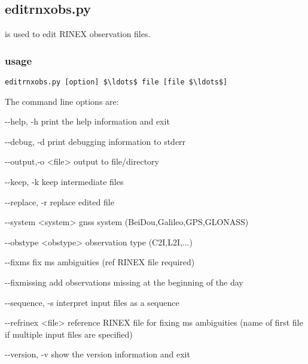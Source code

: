 \subsection{editrnxobs.py}

\hypertarget{h:editrnxobs}{}

 is used to edit RINEX observation files. 

\subsubsection{usage}

\begin{lstlisting}[mathescape=true]
editrnxobs.py [option] $\ldots$ file [file $\ldots$] 
\end{lstlisting}
The command line options are:
\begin{description*}
	\item[-{}-help, -h]            print the help information and exit
  \item[-{}-debug, -d]           print debugging information to stderr
  \item[-{}-output,-o \textless{file}\textgreater]  output to file/directory
  \item[-{}-keep, -k]            keep intermediate files
  \item[-{}-replace, -r]         replace edited file
  \item[-{}-system \textless{system}\textgreater ]      gnss system (BeiDou,Galileo,GPS,GLONASS)
  \item[-{}-obstype \textless{obstype}\textgreater]     observation type (C2I,L2I,...)
  \item[-{}-fixms ]              fix ms ambiguities (ref RINEX file required)
  \item[-{}-fixmissing ]         add observations missing at the beginning of the day
  \item[-{}-sequence, -s ]       interpret input files as a sequence
  \item[-{}-refrinex \textless{file}\textgreater ]  reference RINEX file for fixing ms ambiguities (name of first file if multiple input files are specified)
  \item[-{}-version, -v ]        show the version information and exit
\end{description*}


